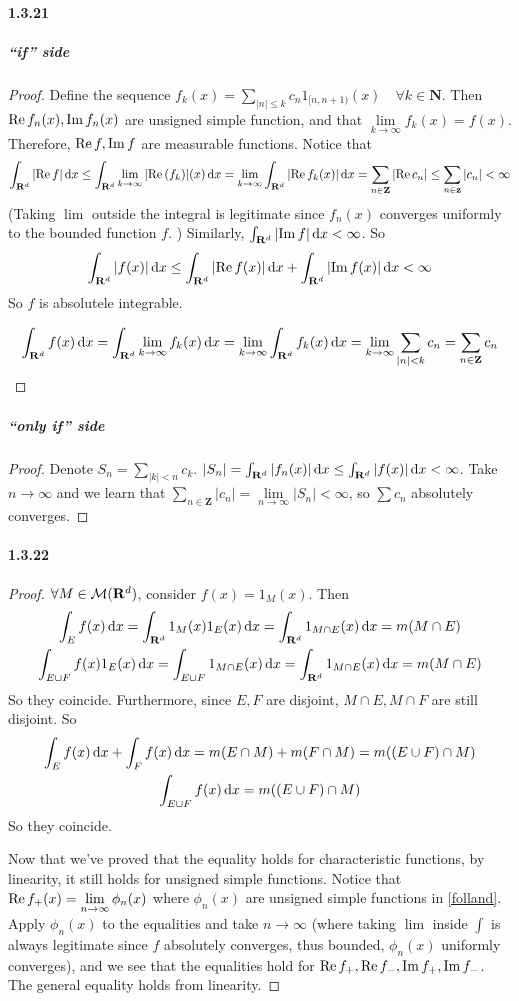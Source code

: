 \documentclass{article}
\begin{document}
\paragraph{1.3.21}
\subparagraph{``if'' side}
\begin{proof}
Define the sequence $f_k(x)=\sum\limits_{|n|\leq k}c_n1_{[n,n+1)}(x)\quad \forall k\in\mathbf{N}$. Then $\mathrm{Re}\, f_n(x),\mathrm{Im}\, f_n(x)$ are unsigned simple function, and that $\lim\limits_{k\to\infty}f_k(x)=f(x)$.  Therefore, $\mathrm{Re}\, f,\mathrm{Im}\, f$ are measurable functions. Notice that 
\[\int_{\mathbf{R}^d}|\mathrm{Re}\, f| \,\mathrm{d} x\leq\int_{\mathbf{R}^d} \lim\limits_{k\to\infty}|\mathrm{Re}\,(f_k)|(x)\,\mathrm{d} x=\lim_{k\to\infty} \int_{\mathbf{R}^d} |\mathrm{Re}\, f_k(x)|\,\mathrm{d} x=\sum_{n\in\mathbf{Z}}|\mathrm{Re}\, c_n|\leq \sum_{n\in\mathbf{z}}|c_n|<\infty\]
(Taking $\lim$ outside the integral is legitimate since $f_n(x)$ converges uniformly to the bounded function $f$. )
Similarly, $\int_{\mathbf{R}^d} |\mathrm{Im}\, f|\,\mathrm{d} x<\infty$. So 
\[\int_{\mathbf{R}^d} |f(x)|\,\mathrm{d} x\leq \int_{\mathbf{R}^d} |\mathrm{Re}\, f(x)|\,\mathrm{d} x+\int_{\mathbf{R}^d} |\mathrm{Im}\, f(x)|\,\mathrm{d} x<\infty\]
So $f$ is absolutele integrable.

\[\int_{\mathbf{R}^d} f(x)\,\mathrm{d} x=\int_{\mathbf{R}^d} \lim_{k\to\infty}f_k(x)\,\mathrm{d} x =\lim_{k\to\infty}\int_{\mathbf{R}^d} f_k(x)\,\mathrm{d} x=\lim_{k\to\infty}\sum_{|n|<k}c_n=\sum_{n\in\mathbf{Z}}c_n\]
\end{proof}
\subparagraph{``only if'' side}
\begin{proof}
Denote $S_n=\sum\limits_{|k|<n}c_k$. $|S_n|=\int_{\mathbf{R}^d} |f_n(x)|\,\mathrm{d} x\leq \int_{\mathbf{R}^d} |f(x)|\,\mathrm{d} x<\infty$. Take $n\to\infty$ and we learn that $\sum\limits_{n\in\mathbf{Z}}|c_n|=\lim\limits_{n\to\infty}|S_n|<\infty$, so $\sum c_n$ absolutely converges.
\end{proof}
 
\paragraph{1.3.22}
\begin{proof}
$\forall M\in\mathcal{M}(\mathbf{R}^d)$, consider $f(x)=1_M(x)$. Then 
\begin{gather}
\int_{E}f(x)\,\mathrm{d} x=\int_{\mathbf{R}^d} 1_M(x)1_E(x)\,\mathrm{d} x=\int_{\mathbf{R}^d} 1_{M\cap E}(x)\,\mathrm{d} x=m(M\cap E)\\
\int_{E\cup F}f(x)1_E(x)\,\mathrm{d} x=\int_{E\cup F}1_{M\cap E}(x)\,\mathrm{d} x=\int_{\mathbf{R}^d} 1_{M\cap E}(x)\,\mathrm{d} x=m(M\cap E)
\end{gather}
So they coincide. Furthermore, since $E,F$ are disjoint, $M\cap E, M\cap F$ are still disjoint. So
\begin{gather}
\int_{E}f(x)\,\mathrm{d} x+\int_{F}f(x)\,\mathrm{d} x=m(E\cap M)+m(F\cap M)=m((E\cup F)\cap M)\\
\int_{E\cup F}f(x)\,\mathrm{d} x=m((E\cup F)\cap M)
\end{gather}
So they coincide.

Now that we've proved that the equality holds for characteristic functions, by linearity, it still holds for unsigned simple functions. Notice that $\mathrm{Re}\, f_+(x)=\lim\limits_{n\to\infty} \phi_n(x)$ where $\phi_n(x)$ are unsigned simple functions in \ref{folland}. Apply $\phi_n(x)$ to the equalities and take $n\to\infty$ (where taking $\lim$ inside $\int$ is always legitimate since $f$ absolutely converges, thus bounded, $\phi_n(x)$ uniformly converges), and we see that the equalities hold for $\mathrm{Re}\, f_+,\mathrm{Re}\, f_-,\mathrm{Im}\, f_+,\mathrm{Im}\, f_-$. The general equality holds from linearity.
\end{proof}
\end{document}
